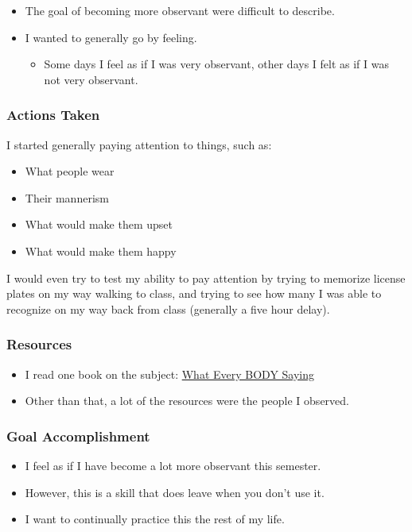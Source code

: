 \documentclass[xclolor=dvipsnames]{beamer}            %
\begin{document}
\begin{darkframes}
\begin{frame}
        \begin{itemize}
            \item The goal of becoming more observant were difficult to describe.
            \item I wanted to generally go by feeling.
                \begin{itemize}
                    \item Some days I feel as if I was very observant, other days I felt as if I was not very observant.
                \end{itemize}
        \end{itemize}
    \end{frame}


    \begin{frame}
        \frametitle{Actions Taken}
        I started generally paying attention to things, such as:

        \begin{itemize}
            \item What people wear
            \item Their mannerism
            \item What would make them upset
            \item What would make them happy
        \end{itemize}

        I would even try to test my ability to pay attention by trying to memorize license plates on my way walking to class, and trying to see how many I was able to recognize on my way back from class (generally a five hour delay).
    \end{frame}


    \begin{frame}
        \frametitle{Resources}

        \begin{itemize}
            \item I read one book on the subject: \href{https://www.amazon.com/What-Every-BODY-Saying-Speed-Reading/dp/B006ZNFEKW}{What Every BODY Saying}
            \item Other than that, a lot of the resources were the people I observed.
        \end{itemize}
    \end{frame}

    \begin{frame}
        \frametitle{Goal Accomplishment}

        \begin{itemize}
            \item I feel as if I have become a lot more observant this semester.
            \item However, this is a skill that does leave when you don't use it.
            \item I want to continually practice this the rest of my life.
        \end{itemize}
    \end{frame}


\end{darkframes}
\end{document}
